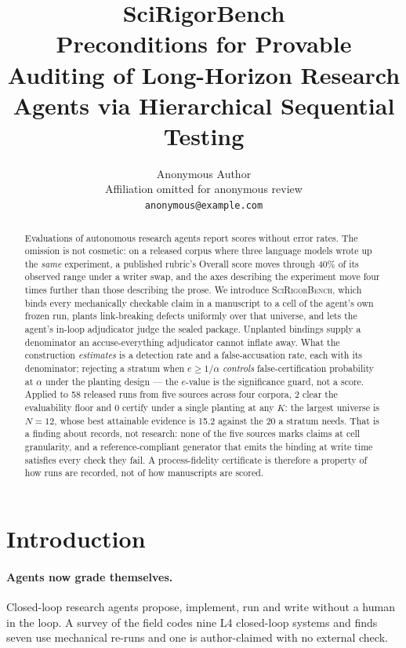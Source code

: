 \documentclass[10pt]{article}
\title{\textbf{SciRigorBench}\\[2pt]
\large Preconditions for Provable Auditing of Long-Horizon Research Agents
via Hierarchical Sequential Testing}
\author{
Anonymous Author\\[2pt]
Affiliation omitted for anonymous review\\
\texttt{anonymous@example.com}
}
\date{}
\newcommand{\RM}[1]{{#1}}
\begin{document}
\maketitle



\begin{abstract}
Evaluations of autonomous research agents report scores without error rates. The omission
is not cosmetic: on a released corpus where three language models wrote up the
\emph{same} experiment, a published rubric's Overall score moves through \RM{40\%} of its
observed range under a writer swap, and the axes describing the experiment move four times
further than those describing the prose. We introduce \textsc{SciRigorBench}, which binds
every mechanically checkable claim in a manuscript to a cell of the agent's own frozen run,
plants link-breaking defects uniformly over that universe, and lets the agent's in-loop
adjudicator judge the sealed package. Unplanted bindings supply a denominator an
accuse-everything adjudicator cannot inflate away. What the construction
\emph{estimates} is a detection rate and a false-accusation rate, each with its
denominator; rejecting a stratum when $e\ge 1/\alpha$ \emph{controls} false-certification
probability at $\alpha$ under the planting design --- the $e$-value is the significance
guard, not a score. Applied to \RM{58} released runs from \RM{five} sources across
\RM{four} corpora, \RM{2} clear the evaluability floor and \RM{0} certify under a single
planting at any $K$: the largest universe is $N=\RM{12}$, whose best attainable evidence
is \RM{15.2} against the \RM{20} a stratum needs. That is a finding about records, not
research: none of the five sources marks claims at cell granularity, and a
reference-compliant generator that emits the binding at write time satisfies every check
they fail. A process-fidelity certificate is therefore a property of how runs are
recorded, not of how manuscripts are scored.
\end{abstract}

\section{Introduction}
\label{sec:intro}

\paragraph{Agents now grade themselves.}
Closed-loop research agents propose, implement, run and write without a human
in the loop. A survey of the field \cite{survey2608} codes nine L4 closed-loop
systems and finds seven use mechanical re-runs and one is author-claimed with
no external check.
\end{document}
